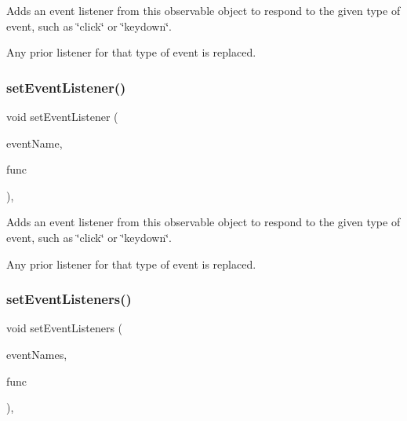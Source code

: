 Adds an event listener from this observable object to respond to the given type of event, such as \char`\"{}click\char`\"{} or \char`\"{}keydown\char`\"{}. 

Any prior listener for that type of event is replaced. \mbox{\label{classsgl_1_1GObservable_abac4cb9f9e626e010e87f5d91573c8a5}} 
\subsubsection{\texorpdfstring{set\+Event\+Listener()}{setEventListener()}\hspace{0.1cm}{\footnotesize\ttfamily [2/2]}}
{\footnotesize\ttfamily void set\+Event\+Listener (\begin{DoxyParamCaption}\item[{const std\+::string \&}]{event\+Name,  }\item[{\mbox{\hyperlink{namespacesgl_a54427ce97bb1c2804e4fe2b0a62e8b17}{G\+Event\+Listener\+Void}}}]{func }\end{DoxyParamCaption})\hspace{0.3cm}{\ttfamily [protected]}, {\ttfamily [virtual]}}



Adds an event listener from this observable object to respond to the given type of event, such as \char`\"{}click\char`\"{} or \char`\"{}keydown\char`\"{}. 

Any prior listener for that type of event is replaced. \mbox{\label{classsgl_1_1GObservable_afa388d69c33c718cf035774604065604}} 
\subsubsection{\texorpdfstring{set\+Event\+Listeners()}{setEventListeners()}\hspace{0.1cm}{\footnotesize\ttfamily [1/2]}}
{\footnotesize\ttfamily void set\+Event\+Listeners (\begin{DoxyParamCaption}\item[{std\+::initializer\+\_\+list$<$ std\+::string $>$}]{event\+Names,  }\item[{\mbox{\hyperlink{namespacesgl_ae9f3e9eab70035da1a2b114e21357b25}{G\+Event\+Listener}}}]{func }\end{DoxyParamCaption})\hspace{0.3cm}{\ttfamily [protected]}, {\ttfamily [virtual]}}




